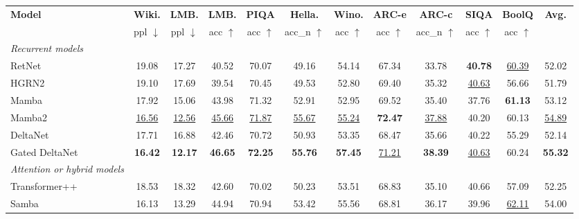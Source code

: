 \documentclass{article}
\begin{document}
\begin{table}[t!]
\vspace{0mm}
\centering
\scriptsize
\addtolength{\tabcolsep}{-2.5pt}    
\begin{tabular}{l|cc|ccccccccc}
\toprule
\textbf{Model}  & \textbf{Wiki.}  &  \textbf{LMB.} &  \textbf{LMB.} & \textbf{PIQA} &    \textbf{Hella.} & \textbf{Wino.} & \textbf{ARC-e} &  \textbf{ARC-c} &  \textbf{SIQA}  & \textbf{BoolQ} &  \textbf{Avg.} \\
 & ppl $\downarrow$  &  ppl $\downarrow$  &  acc $\uparrow$  & acc $\uparrow$ &   acc\_n $\uparrow$  & acc $\uparrow$  & acc $\uparrow$ & acc\_n $\uparrow$ &  acc $\uparrow$  & acc $\uparrow$ &     \\
\midrule
\midrule
\textit{Recurrent models} \\
\hspace{2mm} RetNet & 19.08 & 17.27 & 40.52 & 70.07 & 49.16 &	54.14 & 67.34	& 33.78 &  \textbf{40.78}  & \underline{60.39}  & 52.02 \\
\hspace{2mm} HGRN2 & 19.10 & 17.69 & 39.54 & 70.45 & 49.53 &	52.80 & 69.40	& 35.32 &  \underline{40.63}  & 56.66  & 51.79 \\
\hspace{2mm} Mamba & 17.92 & 15.06 & 43.98 & 71.32 & 52.91 &	52.95 & 69.52	& 35.40 &  37.76  & \textbf{61.13}  & 53.12 \\
\hspace{2mm} Mamba2 & \underline{16.56} & \underline{12.56} & \underline{45.66} & \underline{71.87} & \underline{55.67} &	\underline{55.24} & \textbf{72.47}	& \underline{37.88} &  40.20  & 60.13  & \underline{54.89} \\
\hspace{2mm} DeltaNet & 17.71 & 16.88 & 42.46 & 70.72 & 50.93 &	53.35 & 68.47	& 35.66 &  40.22  & 55.29  & 52.14 \\
\hspace{2mm} Gated DeltaNet & \textbf{16.42} & \textbf{12.17} & \textbf{46.65} & \textbf{72.25} & \textbf{55.76} &\textbf{57.45} & \underline{71.21}	& \textbf{38.39} &  \underline{40.63}  & 60.24  & \textbf{55.32} \\
\midrule
\textit{Attention or hybrid models} \\ 
\hspace{2mm} Transformer++ & 18.53 & 18.32 & 42.60 & 70.02 & 50.23 &	53.51 & 68.83	& 35.10 &  40.66  & 57.09  & 52.25 \\
\hspace{2mm} Samba & 16.13 & 13.29 & 44.94 & 70.94 & 53.42 &	55.56 & 68.81	& 36.17 &  39.96  & \underline{62.11}  & 54.00 \\

\end{tabular}
\end{table}
\end{document}
